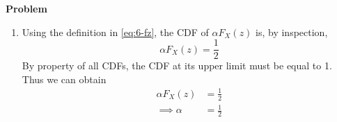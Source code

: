 \documentclass[12pt]{article}
\newenvironment{Ex}{\textbf{Problem}\vspace{.75em}\\}{}
\begin{document}
\begin{enumerate}
\begin{Ex}
\begin{solution}
\begin{enumerate}
\begin{multicols}{2}
\begin{equation}
\begin{aligned}
                & p &&\quad 0\le x<1 \\
                & 0 &&\quad \text{otherwise} \\
              \end{aligned} \right.
          \end{equation} &
          \begin{equation}
            \label{eq:6a-cdf-fy}
            F_{Y}(Y) = \left\{
              \begin{aligned}
                & 1-e^{-\lambda y} &&\quad y\ge0 \\
                & 0 && \text {otherwise} \\
              \end{aligned} \right.
          \end{equation}
        \end{multicols}
        The CDF of $Z$ with $\alpha = \frac{1}{2}$ can be described as
        \begin{equation}
          \label{eq:6a-cdf-fz-def}
          F_{Z}(z) = \frac{1}{2}F_{X}(x) + \frac{1}{2}F_{Y}(y)
        \end{equation}
        This turns into a piecewise CDF
        \begin{equation}
          \label{eq:6a-cdf-fz-sol}
          F_{Z}(z) = \left\{
            \begin{aligned}
              & \frac{1}{2}(p+1-e^{-\lambda y}) &&\quad 0 \le z \le 1 \\
              & 1- \frac{1}{2}e^{-\lambda y} &&\quad z\ge1 \\
              & 0 &&\quad\text{otherwise} \\
            \end{aligned} \right.
        \end{equation}
      \item Using the definition in \cref{eq:6-fz}, the CDF of
        $\alpha F_X(z)$ is, by inspection,
        \begin{equation}
          \label{eq:fx-def}
          \alpha F_X(z) = \frac{1}{2}
        \end{equation}
        By property of all CDFs, the CDF at its upper limit must be
        equal to 1. Thus we can obtain
        \begin{equation}
          \label{eq:fx}
          \begin{aligned}
            \alpha F_X(z) &= \frac{1}{2} \\
            \implies \alpha &= \frac{1}{2} \\

\end{aligned}
\end{equation}
\end{enumerate}
\end{solution}
\end{Ex}
\end{enumerate}
\end{document}
